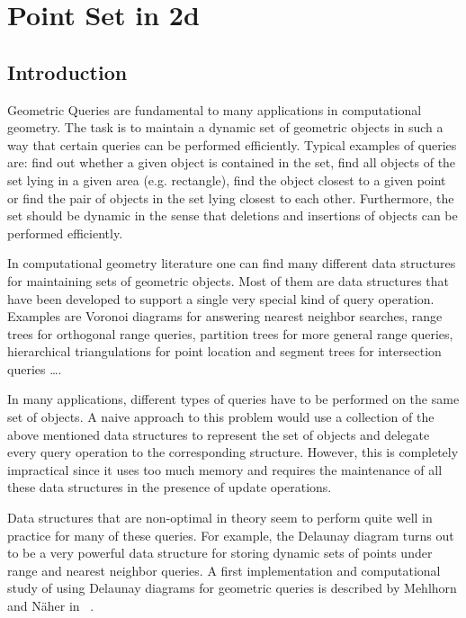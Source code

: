 
\ccParDims

\chapter{Point Set in 2d}
\label{chapterPoint_set_2}


\section{Introduction}

Geometric Queries are fundamental to many applications in computational
geometry. The task is to maintain a dynamic set of geometric objects
in such a way that certain queries can be performed efficiently.
Typical examples of queries are:
find out whether a given object is contained in the set,
find all objects of the set lying in a given area (e.g. rectangle),
find the object closest to a given point or
find the pair of objects in the set lying closest to each other. 
Furthermore, the set should be dynamic in the sense that deletions and 
insertions of objects can be performed efficiently.

In computational geometry literature one can find many different data structures for
maintaining sets of geometric objects. Most of them are data structures 
that have been developed to support a single very special kind of query 
operation.
Examples are Voronoi diagrams for answering nearest neighbor
searches, range trees for orthogonal range queries, partition trees
for more general range queries, hierarchical triangulations for point
location and segment trees for intersection queries \dots.

In many applications, different types of queries have to be
performed on the same set of objects. A naive approach to this
problem would use a collection of the above mentioned data structures to
represent the set of objects and delegate every query operation to
the corresponding structure.
However, this is completely impractical since it uses too much
memory and requires the maintenance of all these data structures in the presence of
update operations.

Data structures that are non-optimal in theory seem to perform quite well in
practice for many of these queries.
For example, the Delaunay diagram turns out to be a very powerful
data structure for storing dynamic sets of points under range and nearest
neighbor queries. A first implementation and computational
study of using Delaunay diagrams for geometric queries is described by
Mehlhorn and N\"aher in ~\cite{LEDAbook}.

